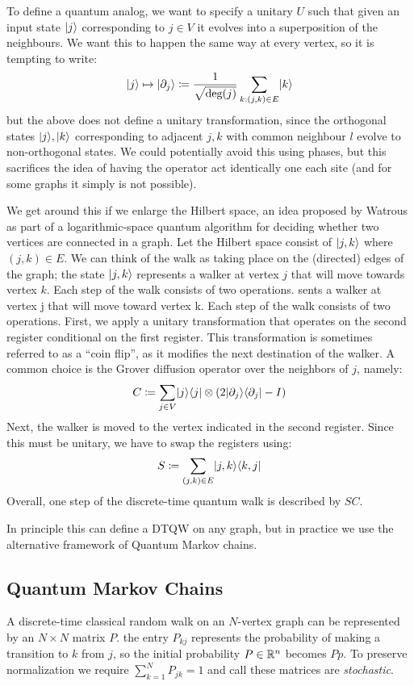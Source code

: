 To define a quantum analog, we want to specify a unitary $U$ such that given an input state $\lvert j \rangle$ corresponding to $j \in V$ it evolves into a superposition of the neighbours. We want this to happen the same way at every vertex, so it is tempting to write:
\begin{equation}
    \lvert j \rangle \mapsto \lvert \partial_j \rangle \coloneqq \frac{1}{\sqrt{\text{deg}(j)}}\sum_{k: (j, k) \in E}\lvert k \rangle
\end{equation}
but the above does not define a unitary transformation, since the orthogonal states $\lvert j \rangle, \lvert k \rangle$ corresponding to adjacent $j, k$ with common neighbour $l$ evolve to non-orthogonal states. We could potentially avoid this using phases, but this sacrifices the idea of having the operator act identically one each site (and for some graphs it simply is not possible).

We get around this if we enlarge the Hilbert space, an idea proposed by Watrous as part of a logarithmic-space quantum algorithm for deciding whether two vertices are connected in a graph. Let the Hilbert space consist of $\lvert j, k \rangle$ where $(j, k) \in E$. We can think of the walk as taking place on the (directed) edges of the graph; the state $\lvert j, k \rangle$ represents a walker at vertex $j$ that will move towards vertex $k$. Each step of the walk consists of two operations. sents a walker at vertex j that will move toward vertex k. Each step of the walk consists of two operations. First, we apply a unitary transformation that operates on the second register conditional on the first register. This transformation is sometimes referred to as a ``coin flip'', as it modifies the next destination of the walker. A common choice is the Grover diffusion operator over the neighbors of $j$, namely:
\begin{equation}
    C \coloneqq \sum_{j \in V}\lvert j \rangle \langle j \rvert \otimes (2\lvert \partial_j \rangle \langle \partial_j \rvert - I)
\end{equation}
Next, the walker is moved to the vertex indicated in the second register. Since this must be unitary, we have to swap the registers using:
\begin{equation}
    S \coloneqq \sum_{(j, k) \in E}\lvert j, k \rangle \langle k, j \rvert
\end{equation}
Overall, one step of the discrete-time quantum walk is described by $SC$.

In principle this can define a DTQW on any graph, but in practice we use the alternative framework of Quantum Markov chains.

\subsection*{Quantum Markov Chains}
A discrete-time classical random walk on an $N$-vertex graph can be represented by an $N \times N$ matrix $P$. the entry $P_{kj}$ represents the probability of making a transition to $k$ from $j$, so the initial probability $P \in \mathbb{R}^n$ becomes $Pp$. To preserve normalization we require $\sum_{k=1}^N P_{jk} = 1$ and call these matrices are \emph{stochastic}.

